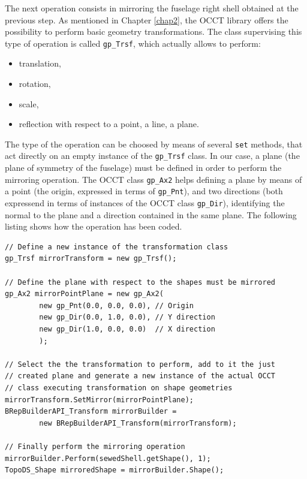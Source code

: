 \bigskip
\noindent
The next operation consists in mirroring the fuselage right shell obtained at the previous step. As mentioned in Chapter \ref{chap2}, the \gls{OCCT} library offers the possibility to perform basic geometry transformations. The class supervising this type of operation is called \lstinline[language=Java]!gp_Trsf!, which actually allows to perform:
%
\begin{itemize}
\item translation,
\item rotation,
\item scale,
\item reflection with respect to a point, a line, a plane.
\end{itemize}
%
The type of the operation can be choosed by means of several \lstinline[language=Java]!set! methods, that act directly on an empty instance of the \lstinline[language=Java]!gp_Trsf! class. In our case, a plane (the plane of symmetry of the fuselage) must be defined in order to perform the mirroring operation. The \gls{OCCT} class \lstinline[language=Java]!gp_Ax2! helps defining a plane by means of a point (the origin, expressed in terms of \lstinline[language=Java]!gp_Pnt!), and two directions (both expressend in terms of instances of the \gls{OCCT} class \lstinline[language=Java]!gp_Dir!), identifying the normal to the plane and a direction contained in the same plane. The following listing shows how the operation has been coded.
%
\bigskip
\begin{lstlisting}[caption={Fuselage right shell mirroring operations}, captionpos=b, tabsize=2, label={lst:ShellMirroring}]
// Define a new instance of the transformation class
gp_Trsf mirrorTransform = new gp_Trsf();

// Define the plane with respect to the shapes must be mirrored
gp_Ax2 mirrorPointPlane = new gp_Ax2(
		new gp_Pnt(0.0, 0.0, 0.0), // Origin
		new gp_Dir(0.0, 1.0, 0.0), // Y direction
		new gp_Dir(1.0, 0.0, 0.0)  // X direction
		);

// Select the the transformation to perform, add to it the just 
// created plane and generate a new instance of the actual OCCT
// class executing transformation on shape geometries
mirrorTransform.SetMirror(mirrorPointPlane);
BRepBuilderAPI_Transform mirrorBuilder = 
		new BRepBuilderAPI_Transform(mirrorTransform);
		
// Finally perform the mirroring operation
mirrorBuilder.Perform(sewedShell.getShape(), 1);
TopoDS_Shape mirroredShape = mirrorBuilder.Shape();
\end{lstlisting}


